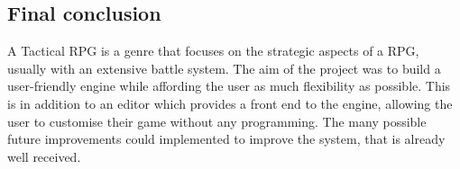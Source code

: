 \subsection{Final conclusion}
A Tactical RPG is a genre that focuses on the strategic aspects of a RPG, usually with an extensive battle system.  The aim of the project was to build a user-friendly engine while affording the user as much flexibility as possible. This is in addition to an editor which provides a front end to the engine, allowing the user to customise their game without any programming.  The many possible future improvements could implemented to improve the system, that is already well received. 
